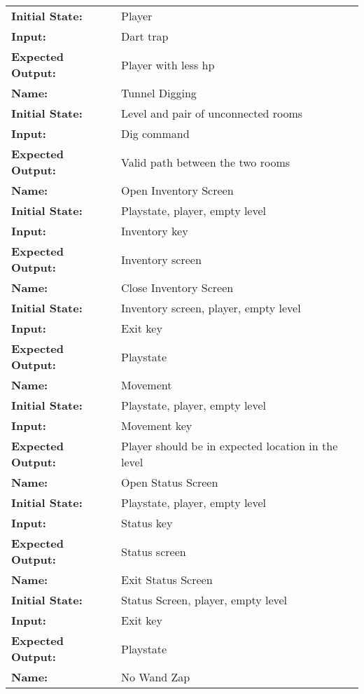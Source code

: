 \documentclass[12pt, titlepage]{article}
\begin{document}
\begin{center}
\begin{longtable}{ l | p{10cm} }
				\textbf{Initial State:} & Player\\
				\textbf{Input:} & Dart trap\\
				\textbf{Expected Output:} & Player with less hp\\[1em]
				\hline
				\rule{0pt}{2em}\textbf{Name:} & Tunnel Digging\\
				\textbf{Initial State:} & Level and pair of unconnected rooms\\
				\textbf{Input:} & Dig command\\
				\textbf{Expected Output:} & Valid path between the two rooms\\[1em]
				\hline
				\rule{0pt}{2em}\textbf{Name:} & Open Inventory Screen\\
				\textbf{Initial State:} & Playstate, player, empty level\\
				\textbf{Input:} & Inventory key\\
				\textbf{Expected Output:} & Inventory screen\\[1em]
				\hline
				\rule{0pt}{2em}\textbf{Name:} & Close Inventory Screen\\
				\textbf{Initial State:} & Inventory screen, player, empty level\\
				\textbf{Input:} & Exit key\\
				\textbf{Expected Output:} & Playstate\\[1em]
				\hline
				\rule{0pt}{2em}\textbf{Name:} & Movement\\
				\textbf{Initial State:} & Playstate, player, empty level\\
				\textbf{Input:} & Movement key\\
				\textbf{Expected Output:} & Player should be in expected location in the level\\[1em]
				\hline
				\rule{0pt}{2em}\textbf{Name:} & Open Status Screen\\
				\textbf{Initial State:} & Playstate, player, empty level\\
				\textbf{Input:} & Status key\\
				\textbf{Expected Output:} & Status screen\\[1em]
				\hline
				\rule{0pt}{2em}\textbf{Name:} & Exit Status Screen\\
				\textbf{Initial State:} & Status Screen, player, empty level\\
				\textbf{Input:} & Exit key\\
				\textbf{Expected Output:} & Playstate\\[1em]
				\hline
				\rule{0pt}{2em}\textbf{Name:} & No Wand Zap\\

\end{longtable}
\end{center}
\end{document}

